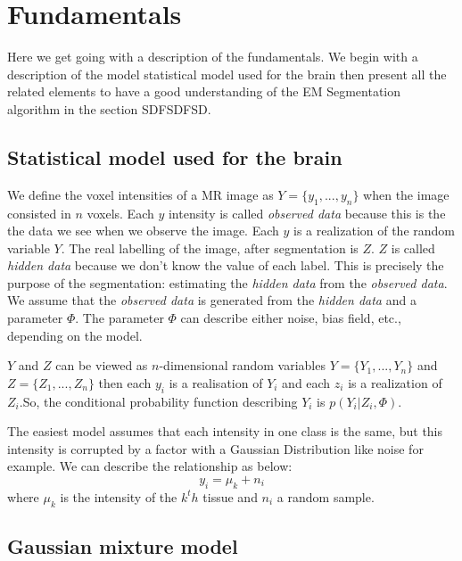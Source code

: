 \section{Fundamentals}
%
Here we get going with a description of the fundamentals. We begin with a description of the model statistical model used for the brain then present all the related elements to have a good understanding of the EM Segmentation algorithm in the section SDFSDFSD.
%
\subsection{Statistical model used for the brain}
%
We define the voxel intensities of a MR image as $Y=\lbrace y_1, ..., y_n\rbrace$ when the image consisted in $n$ voxels. Each $y$ intensity is called \textit{observed data} because this is the the data we see when we observe the image. Each $y$ is a realization of the random variable $Y$. The real labelling of the image, after segmentation is $Z$. $Z$ is called \textit{hidden data} because we don't know the value of each label. This is precisely the purpose of the segmentation: estimating the \textit{hidden data} from the \textit{observed data}. We assume that the \textit{observed data} is generated from the \textit{hidden data} and a parameter $\Phi$. The parameter $\Phi$ can describe either noise, bias field, etc., depending on the model.
\par
$Y$ and $Z$ can be viewed as $n$-dimensional random variables $Y=\lbrace Y_1, ..., Y_n\rbrace$ and $Z=\lbrace Z_1, ..., Z_n\rbrace$ then each $y_i$ is a realisation of $Y_i$ and each $z_i$ is a realization of $Z_i$.So, the conditional probability function describing $Y_i$ is $p(Y_i|Z_i,\Phi)$.
\par
The easiest model assumes that each intensity in one class is the same, but this intensity is corrupted by a factor with a Gaussian Distribution like noise for example. We can describe the relationship as below:
\begin{equation*}
  y_i=\mu_k+n_i
\end{equation*}
where $\mu_k$ is the intensity of the $k^th$ tissue and $n_i$ a random sample.

%
\subsection{Gaussian mixture model}
%

